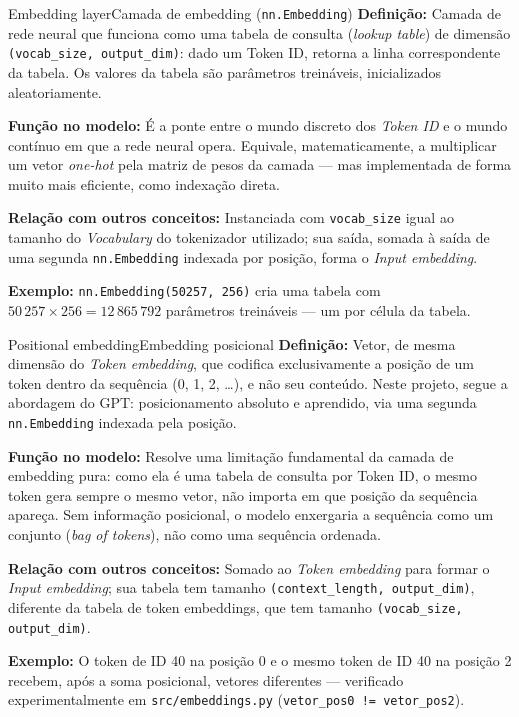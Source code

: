 \documentclass[11pt,a4paper]{article}
\newcommand{\campo}[2]{\textbf{\textcolor{accentblue}{#1:}} #2\par\smallskip}
\begin{document}
\begin{termo}{Embedding layer}{Camada de embedding (\texttt{nn.Embedding})}
\campo{Definição}{Camada de rede neural que funciona como uma tabela de consulta
(\emph{lookup table}) de dimensão \texttt{(vocab\_size, output\_dim)}: dado um Token
ID, retorna a linha correspondente da tabela. Os valores da tabela são parâmetros
treináveis, inicializados aleatoriamente.}
\campo{Função no modelo}{É a ponte entre o mundo discreto dos \emph{Token ID} e o
mundo contínuo em que a rede neural opera. Equivale, matematicamente, a multiplicar um
vetor \emph{one-hot} pela matriz de pesos da camada --- mas implementada de forma muito
mais eficiente, como indexação direta.}
\campo{Relação com outros conceitos}{Instanciada com \texttt{vocab\_size} igual ao
tamanho do \emph{Vocabulary} do tokenizador utilizado; sua saída, somada à saída de
uma segunda \texttt{nn.Embedding} indexada por posição, forma o
\emph{Input embedding}.}
\campo{Exemplo}{\texttt{nn.Embedding(50257, 256)} cria uma tabela com
$50\,257 \times 256 = 12\,865\,792$ parâmetros treináveis --- um por célula da tabela.}
\end{termo}

\begin{termo}{Positional embedding}{Embedding posicional}
\campo{Definição}{Vetor, de mesma dimensão do \emph{Token embedding}, que codifica
exclusivamente a posição de um token dentro da sequência (0, 1, 2, \ldots), e não seu
conteúdo. Neste projeto, segue a abordagem do GPT: posicionamento absoluto e aprendido,
via uma segunda \texttt{nn.Embedding} indexada pela posição.}
\campo{Função no modelo}{Resolve uma limitação fundamental da camada de embedding
pura: como ela é uma tabela de consulta por Token ID, o mesmo token gera sempre o mesmo
vetor, não importa em que posição da sequência apareça. Sem informação posicional, o
modelo enxergaria a sequência como um conjunto (\emph{bag of tokens}), não como uma
sequência ordenada.}
\campo{Relação com outros conceitos}{Somado ao \emph{Token embedding} para formar o
\emph{Input embedding}; sua tabela tem tamanho
\texttt{(context\_length, output\_dim)}, diferente da tabela de token embeddings, que
tem tamanho \texttt{(vocab\_size, output\_dim)}.}
\campo{Exemplo}{O token de ID 40 na posição 0 e o mesmo token de ID 40 na posição 2
recebem, após a soma posicional, vetores diferentes --- verificado experimentalmente
em \texttt{src/embeddings.py} (\texttt{vetor\_pos0 != vetor\_pos2}).}
\end{termo}
\end{document}
